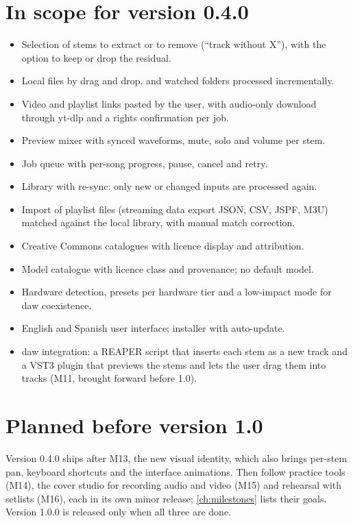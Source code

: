 \documentclass{covermaker}
\begin{document}
\section{In scope for version 0.4.0}
\begin{itemize}
  \item Selection of stems to extract or to remove (``track without X''), with
        the option to keep or drop the \gls{residual}.
  \item Local files by drag and drop, and watched folders processed incrementally.
  \item Video and playlist links pasted by the user, with audio-only download
        through yt-dlp and a rights confirmation per job.
  \item Preview mixer with synced waveforms, mute, solo and volume per stem.
  \item Job queue with per-song progress, pause, cancel and retry.
  \item Library with re-sync: only new or changed inputs are processed again.
  \item Import of playlist files (streaming data export JSON, CSV, JSPF, M3U)
        matched against the local library, with manual match correction.
  \item Creative Commons catalogues with licence display and attribution.
  \item Model catalogue with licence class and provenance; no default model.
  \item Hardware detection, presets per hardware tier and a low-impact mode
        for \gls{daw} coexistence.
  \item English and Spanish user interface; installer with auto-update.
  \item \gls{daw} integration: a REAPER script that inserts each stem as a new
        track and a VST3 plugin that previews the stems and lets the user drag
        them into tracks (M11, brought forward before 1.0).
\end{itemize}

\section{Planned before version 1.0}
Version 0.4.0 ships after M13, the new visual identity, which also brings
per-stem pan, keyboard shortcuts and the interface animations. Then follow
practice tools (M14), the cover studio for recording audio and video (M15) and
rehearsal with setlists (M16), each in its own minor release;
\autoref{ch:milestones} lists their goals. Version 1.0.0 is released only when
all three are done.
\end{document}
